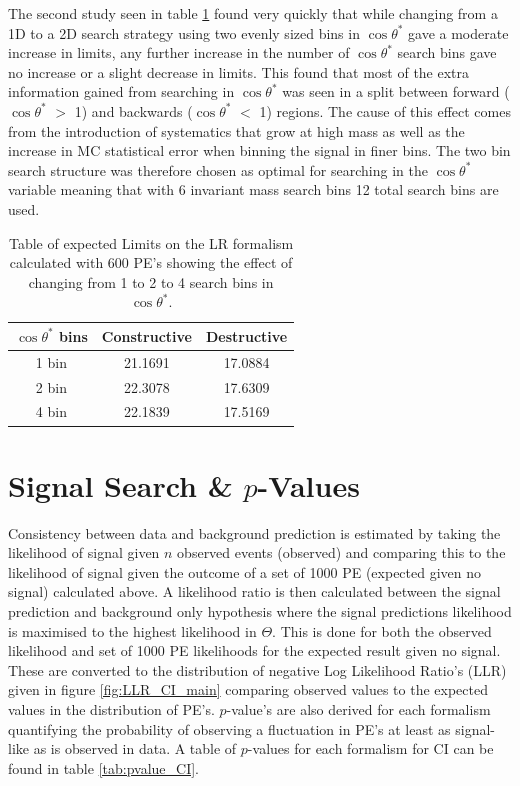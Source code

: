     The second study seen in table \ref{tab:limits_fourbin} found very quickly that while changing from a 1D to a 2D search strategy using two evenly sized bins in $\cos{\theta^{*}}$ gave a moderate increase in limits, any further increase in the number of $\cos{\theta^{*}}$ search bins gave no increase or a slight decrease in limits. This found that most of the extra information gained from searching in $\cos{\theta^{*}}$ was seen in a split between forward ($\cos{\theta^{*}}$ $>$ 1) and backwards ($\cos{\theta^{*}}$ $<$ 1) regions. The cause of this effect comes from the introduction of systematics that grow at high mass as well as the increase in MC statistical error when binning the signal in finer bins. 
    The two bin search structure was therefore chosen as optimal for searching in the $\cos{\theta^{*}}$ variable meaning that with 6 invariant mass search bins 12 total search bins are used. 

 
    \begin {table}[h]
        \begin{center}
        \begin{tabular}{ | c | c | c | } 
            \hline
            \hline
            $\cos{\theta^{*}}$ bins & Constructive & Destructive \\
            \hline
            1 bin & 21.1691 & 17.0884 \\
            2 bin & 22.3078 & 17.6309 \\
            4 bin & 22.1839 & 17.5169 \\
            \hline
            \hline
        \end{tabular}
        \caption{Table of expected Limits on the LR formalism calculated with 600 PE's showing the effect of changing from 1 to 2 to 4 search bins in $\cos{\theta^{*}}$.}
        \label{tab:limits_fourbin}
        \end{center}
    \end {table}


\section{Signal Search \& $p$-Values}

    Consistency between data and background prediction is estimated by taking the likelihood of signal given $n$ observed events (observed) and comparing this to the likelihood of signal given the outcome of a set of 1000 PE (expected given no signal) calculated above. A likelihood ratio is then calculated between the signal prediction and background only hypothesis where the signal predictions likelihood is maximised to the highest likelihood in $\Theta$. This is done for both the observed likelihood and set of 1000 PE likelihoods for the expected result given no signal. These are converted to the distribution of negative Log Likelihood Ratio's (LLR) given in figure \ref{fig:LLR_CI_main} comparing observed values to the expected values in the distribution of PE's. $p$-value's are also derived for each formalism quantifying the probability of observing a fluctuation in PE's at least as signal-like as is observed in data. A table of $p$-values for each formalism for CI can be found in table \ref{tab:pvalue_CI}. 


